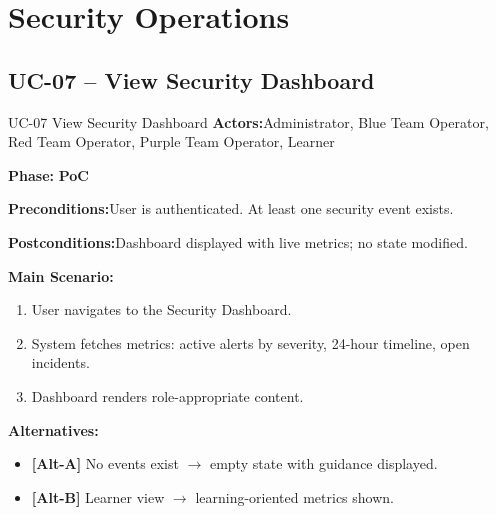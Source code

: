 \documentclass[12pt,a4paper]{report}
\newcommand{\ucfield}[2]{%
    \noindent\textbf{\color{helixpurplemid}#1:}\quad #2\par\medskip
}
\newcommand{\ucphase}[1]{%
    \noindent\textbf{\color{helixpurplemid}Phase:}\quad%
    \ifstrequal{#1}{PoC}{\textcolor{helixteal}{\textbf{PoC}}}{\textcolor{helixamber}{\textbf{Future MVP}}}%
    \par\medskip
}
\begin{document}
\chapter{Security Operations}

\section{UC-07 -- View Security Dashboard}
\begin{ucbox}{UC-07 \quad View Security Dashboard}
    \ucfield{Actors}{Administrator, Blue Team Operator, Red Team Operator, Purple Team Operator, Learner}
    \ucphase{PoC}
    \ucfield{Preconditions}{User is authenticated. At least one security event exists.}
    \ucfield{Postconditions}{Dashboard displayed with live metrics; no state modified.}
    \textbf{\color{helixpurplemid}Main Scenario:}
    \begin{enumerate}
        \item User navigates to the Security Dashboard.
        \item System fetches metrics: active alerts by severity, 24-hour timeline, open incidents.
        \item Dashboard renders role-appropriate content.
    \end{enumerate}
    \textbf{\color{helixpurplemid}Alternatives:}
    \begin{itemize}
        \item \textbf{[Alt-A]} No events exist $\rightarrow$ empty state with guidance displayed.
        \item \textbf{[Alt-B]} Learner view $\rightarrow$ learning-oriented metrics shown.
    \end{itemize}
\end{ucbox}
\end{document}
